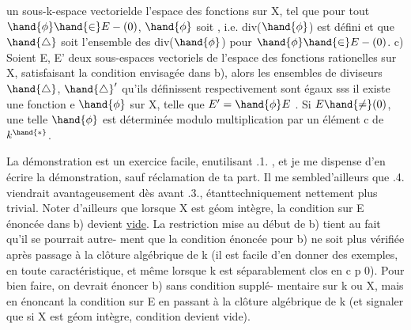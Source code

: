 
un sous-k-espace vectorielde l'espace des  fonctions    
sur X, tel que pour tout $\hand{\phi} \hand{\in} E-(0)$, $\hand{\phi}$ soit  
  , i.e. div($\hand{\phi}$) est défini 
\hand{\unsure{,|)}} et que $\hand{\triangle}$ soit l'ensemble des div($\hand{\phi}$) pour $\hand{\phi} \hand{\in} E-(0)$.
c) Soient E, E' deux sous-espaces vectoriels de l'espace des
fonctions rationelles   sur X,  satisfaisant la condition
envisagée dans b), alors les ensembles de diviseurs $\hand{\triangle}$, $\hand{\triangle}'$ qu'ils
définissent respectivement sont égaux sss il existe une  fonction
e   $\hand{\phi}$ sur X, telle que $E' = \hand{\phi} E$ . Si $E\hand{\neq}(0)$, une
telle $\hand{\phi}$ est déterminée modulo multiplication par un élément c de $k^{\hand{*}}$.

La démonstration est un exercice facile, enutilisant .1. , et je
me dispense d'en écrire la démonstration, sauf réclamation de ta part. Il
\margin{||} me sembled'ailleurs que .4. viendrait avantageusement dès avant .3.,
étanttechniquement nettement plus trivial. Noter d'ailleurs que lorsque
X est géom intègre, la condition sur E énoncée dans b) devient \uline{vide}.
La restriction mise au début de b) tient au fait qu'il se pourrait autre-%
ment que la condition énoncée pour b) ne soit plus vérifiée après passage
à la clôture algébrique de k (il est facile d'en donner des exemples,
en toute caractéristique, et même lorsque k est séparablement clos en
c p \hand{$>$} 0). Pour bien faire, on devrait énoncer b) sans condition supplé-%
mentaire sur k ou X, mais en énoncant la condition sur E en passant à la
clôture algébrique de k (et signaler que si X est géom intègre, 
condition devient vide). 

